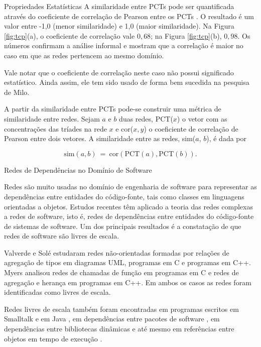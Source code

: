 \begin{section}{Propriedades Estatísticas}
A similaridade entre PCTs pode ser quantificada através do coeficiente de correlação de Pearson entre os PCTs \cite{Milo2004}. O resultado é um valor entre -1,0 (menor similaridade) e 1,0 (maior similaridade). Na Figura \ref{fig:tcp}(a), o coeficiente de correlação vale $0,68$; na Figura \ref{fig:tcp}(b), $0,98$. Os números confirmam a análise informal e mostram que a correlação é maior no caso em que as redes pertencem ao mesmo domínio.

Vale notar que o coeficiente de correlação neste caso não possui significado estatístico. Ainda assim, ele tem sido usado de forma bem sucedida na pesquisa de Milo.

A partir da similaridade entre PCTs pode-se construir uma métrica de similaridade entre redes. Sejam $a$ e $b$ duas redes, PCT($x$) o vetor com as concentrações das tríades na rede $x$ e cor($x, y$) o coeficiente de correlação de Pearson entre dois vetores. A similaridade entre as redes, sim($a$, $b$), é dada por

$$
\mathrm{sim}(a, b) ~=~ 
  \mathrm{cor}(\mathrm{PCT}(a), \mathrm{PCT}(b))\mathrm{.}
$$

\end{section}

\begin{section}{Redes de Dependências no Domínio de Software}

	Redes são muito usadas no domínio de engenharia de software para representar as dependências entre entidades do código-fonte, tais como classes em linguagens orientadas a objetos. 
	Estudos recentes têm aplicado a teoria das redes complexas a redes de software, isto é, redes de dependências entre entidades do código-fonte de sistemas de software. Um dos principais resultados é a constatação de que redes de software são livres de escala.

	
	Valverde e Solé \cite{Valverde2003} estudaram redes não-orientadas formadas por relações de agregação de tipos em diagramas UML, programas em C e programas em C++. Myers \cite{Myers2003} analisou redes de chamadas de função em programas em C e redes de agregação e herança em programas em C++. Em ambos os casos as redes foram identificadas como livres de escala. 

	Redes livres de escala também foram encontradas em programas escritos em Smalltalk \cite{Marchesi2004,Concas2007} e em Java \cite{Hyland-Wood2006,Baxter2006,Ichii2008}, em dependências entre pacotes de software \cite{Labelle2004}, em dependências entre bibliotecas dinâmicas \cite{Louridas2008} e até mesmo em referências entre objetos em tempo de execução \cite{Potanin2005}.
\end{section}

